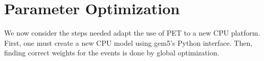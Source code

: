 \chapter{Parameter Optimization}

We now consider the steps needed adapt the use of PET to a new CPU platform.
First, one must create a new CPU model using gem5's Python interface. Then,
finding correct weights for the events is done by global optimization.






